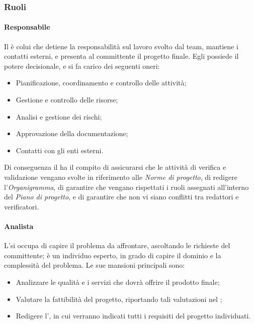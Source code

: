 \subsubsection{Ruoli}
\paragraph{Responsabile}
Il \RdP{} è colui che detiene la responsabilità sul lavoro svolto dal team, mantiene i contatti esterni, e presenta al committente il progetto finale. Egli possiede il potere decisionale, e si fa carico dei seguenti oneri:
\begin{itemize}
	\item Pianificazione, coordinamento e controllo delle attività;
	\item Gestione e controllo delle risorse;
	\item Analisi e gestione dei rischi;
	\item Approvazione della documentazione;
	\item Contatti con gli enti esterni.
\end{itemize}
Di conseguenza il \RdP{} ha il compito di assicurarsi che le attività di verifica e validazione vengano svolte in riferimento alle \emph{Norme di progetto}, di redigere l'\emph{{{Organigramma}}}, di garantire che vengano rispettati i ruoli assegnati all'interno del \emph{Piano di progetto}, e di garantire che non vi siano conflitti tra redattori e verificatori. 

\paragraph{Analista}
L'\ana si occupa di capire il problema da affrontare, ascoltando le richieste del committente; è un individuo esperto, in grado di capire il dominio e la complessità del problema. Le sue mansioni principali sono:
\begin{itemize}
	\item Analizzare le qualità e i servizi che dovrà offrire il prodotto finale;
	\item Valutare la fattibilità del progetto, riportando tali valutazioni nel \SdF{};
	\item Redigere l'\AdR{}, in cui verranno indicati tutti i requisiti del progetto individuati.
\end{itemize}

